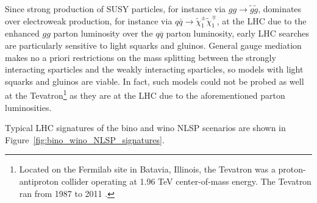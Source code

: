 \documentclass[dissertation.tex]{subfiles}
\begin{document}
Since strong production of SUSY particles, for instance via $gg\rightarrow\tilde{g}\tilde{g}$, dominates over electroweak production, for instance via $q\bar{q}\rightarrow\tilde{\chi}_{1}^{\pm}\tilde{\chi}_{1}^{\mp}$, at the LHC due to the enhanced $gg$ parton luminosity over the $q\overline{q}$ parton luminosity, early LHC searches are particularly sensitive to light squarks and gluinos.  General gauge mediation makes no a priori restrictions on the mass splitting between the strongly interacting sparticles and the weakly interacting sparticles, so models with light squarks and gluinos are viable.  In fact, such models could not be probed as well at the Tevatron\footnote{Located on the Fermilab site in Batavia, Illinois, the Tevatron was a proton-antiproton collider operating at 1.96 TeV center-of-mass energy.  The Tevatron ran from 1987 to 2011 \cite{Tevatron_lifetime}.} as they are at the LHC due to the aforementioned parton luminosities.

Typical LHC signatures of the bino and wino NLSP scenarios are shown in Figure~\ref{fig:bino_wino_NLSP_signatures}.
\end{document}
